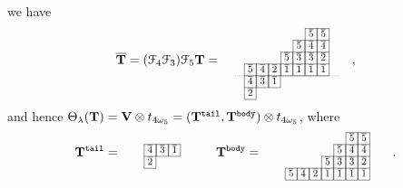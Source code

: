 \documentclass[leqno,11pt]{amsart}
\numberwithin{equation}{section}
\newcommand{\ov}{\overline}
\newcommand{\mc}{\mathcal}
\newcommand{\la}{\lambda}
\begin{document}
we have 
$$
\ov{\bf T}=(\mc{F}_4\mc{F}_3)\mc{F}_5 {\bf T}=\quad 
\resizebox{.24\hsize}{!}
{\def\lr#1{\multicolumn{1}{|@{\hspace{.75ex}}c@{\hspace{.75ex}}|}{\raisebox{-.04ex}{$#1$}}}\raisebox{-.6ex}
{$\begin{array}{ccccccccccccccccccc}
\cline{7-8}
& & & & &   & \lr{\ov{5}} & \lr{\ov{5}} &  \\
\cline{6-8}
& & & & &  \lr{\ov 5} & \lr{\ov{4}} & \lr{\ov{4}} &  \\
\cline{5-8}
& & & & \lr{\ov{5}} & \lr{\ov{3}} & \lr{\ov{3}}  & \lr{\ov{2}}  &  \\
\cline{2-8}
& \lr{\ov{5}} & \lr{\ov{4}}  & \lr{\ov{2}} & \lr{\ov{1}} & \lr{\ov{1}} & \lr{\ov{1}} & \lr{\ov{1}} &  \\
\cline{2-8}\cdashline{1-11}[0.5pt/1pt]
& \lr{\ov{4}} & \lr{\ov{3}} & \lr{\ov 1} &    \\
\cline{2-4}
& \lr{\ov{2}} &  \\
\cline{2-2}
\end{array}$}}\quad ,
$$\vskip 2mm
\noindent and hence  
$\Theta_\la({\bf T})={\bf V}\otimes t_{4\omega_5}=({\bf T}^{\tt tail}, {\bf T}^{\tt body})\otimes t_{4\omega_5}$, where \vskip 2mm
$$
{\bf T}^{\tt tail}=\quad 
\resizebox{.13\hsize}{!}
{\def\lr#1{\multicolumn{1}{|@{\hspace{.75ex}}c@{\hspace{.75ex}}|}{\raisebox{-.04ex}{$#1$}}}\raisebox{-.6ex}
{$\begin{array}{ccccccccccccccccccc}
\cline{2-4} 
& \lr{\ov{4}} & \lr{\ov{3}} & \lr{\ov 1} &    \\
\cline{2-4}
& \lr{\ov{2}} &  \\
\cline{2-2}
\end{array}$}}\quad\quad
{\bf T}^{\tt body}=\quad 
\resizebox{.24\hsize}{!}
{\def\lr#1{\multicolumn{1}{|@{\hspace{.75ex}}c@{\hspace{.75ex}}|}{\raisebox{-.04ex}{$#1$}}}\raisebox{-.6ex}
{$\begin{array}{ccccccccccccccccccc}
\cline{7-8}
& & & & &   & \lr{\ov{5}} & \lr{\ov{5}} &  \\
\cline{6-8}
& & & & &  \lr{\ov 5} & \lr{\ov{4}} & \lr{\ov{4}} &  \\
\cline{5-8}
& & & & \lr{\ov{5}} & \lr{\ov{3}} & \lr{\ov{3}}  & \lr{\ov{2}}  &  \\
\cline{2-8}
& \lr{\ov{5}} & \lr{\ov{4}}  & \lr{\ov{2}} & \lr{\ov{1}} & \lr{\ov{1}} & \lr{\ov{1}} & \lr{\ov{1}} &  \\
\cline{2-8}
\end{array}$}}\quad .
$$ \vskip 3mm
\end{document}
